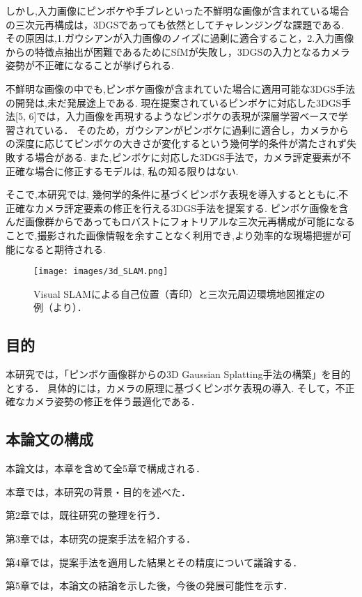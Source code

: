 しかし,入力画像にピンボケや手ブレといった不鮮明な画像が含まれている場合の三次元再構成は，3DGSであっても依然としてチャレンジングな課題である.
その原因は,1.ガウシアンが入力画像のノイズに過剰に適合すること，2.入力画像からの特徴点抽出が困難であるためにSfMが失敗し，3DGSの入力となるカメラ姿勢が不正確になることが挙げられる.\par

不鮮明な画像の中でも,ピンボケ画像が含まれていた場合に適用可能な3DGS手法の開発は,未だ発展途上である.
現在提案されているピンボケに対応した3DGS手法[5, 6]では，入力画像を再現するようなピンボケの表現が深層学習ベースで学習されている．
そのため，ガウシアンがピンボケに過剰に適合し，カメラからの深度に応じてピンボケの大きさが変化するという幾何学的条件が満たされず失敗する場合がある.
また,ピンボケに対応した3DGS手法で，カメラ評定要素が不正確な場合に修正するモデルは, 私の知る限りはない.\par

そこで,本研究では, 幾何学的条件に基づくピンボケ表現を導入するとともに,不正確なカメラ評定要素の修正を行える3DGS手法を提案する.
ピンボケ画像を含んだ画像群からであってもロバストにフォトリアルな三次元再構成が可能になることで,撮影された画像情報を余すことなく利用でき,より効率的な現場把握が可能になると期待される.

\begin{figure}
    \centering
    \texttt{[image: images/3d\_SLAM.png]}
    \caption[Visual SLAMによる自己位置と三次元周辺環境地図推定の例]{Visual SLAMによる自己位置（青印）と三次元周辺環境地図推定の例（\cite{mur2017orb}より）．}
    \label{fig:visual slam example}
\end{figure}



\subsection{目的}\label{subsec:objective}

本研究では，「ピンボケ画像群からの3D Gaussian Splatting手法の構築」を目的とする．
具体的には，カメラの原理に基づくピンボケ表現の導入.
そして，不正確なカメラ姿勢の修正を伴う最適化である．

\subsection{本論文の構成}\label{subsec:construction}

本論文は，本章を含めて全5章で構成される．

本章では，本研究の背景・目的を述べた．

第2章では，既往研究の整理を行う．

第3章では，本研究の提案手法を紹介する．

第4章では，提案手法を適用した結果とその精度について議論する．

第5章では，本論文の結論を示した後，今後の発展可能性を示す．